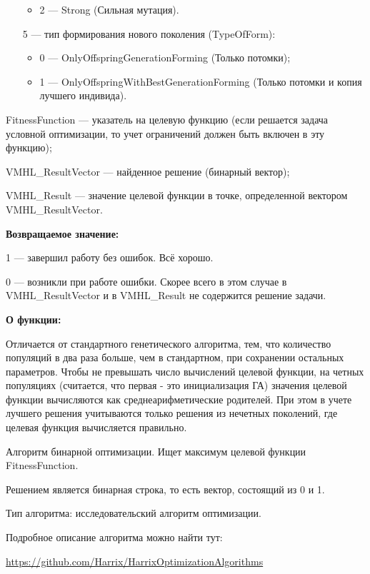 \documentclass[a4paper,12pt]{article}
\begin{document}
\begin{itemize}
\begin{itemize}
       \item 2 --- Strong (Сильная мутация).
	    \end{itemize}
 
 \item [5] --- тип формирования нового поколения (TypeOfForm):
  \begin{itemize}
       \item 0 --- OnlyOffspringGenerationForming (Только потомки);
 
       \item 1 --- OnlyOffspringWithBestGenerationForming (Только потомки и копия лучшего индивида).
	    \end{itemize}
 \end{itemize}
 
FitnessFunction --- указатель на целевую функцию (если решается задача условной оптимизации, то учет ограничений должен быть включен в эту функцию);
 
VMHL\_ResultVector --- найденное решение (бинарный вектор);
 
VMHL\_Result --- значение целевой функции в точке, определенной вектором VMHL\_ResultVector.

\textbf{Возвращаемое значение:} 

 1 --- завершил работу без ошибок. Всё хорошо.
 
 0 --- возникли при работе ошибки. Скорее всего в этом случае в VMHL\_ResultVector и в VMHL\_Result не содержится решение задачи.

\textbf{О функции:}

Отличается от стандартного генетического алгоритма, тем, что количество популяций в два раза больше, чем в стандартном, при сохранении остальных параметров. Чтобы не превышать число вычислений целевой функции, на четных популяциях (считается, что первая - это инициализация ГА) значения целевой функции вычисляются как среднеарифметические родителей. При этом в учете лучшего решения учитываются только решения из нечетных поколений, где целевая функция вычисляется правильно.

Алгоритм бинарной оптимизации. Ищет максимум целевой функции FitnessFunction.

Решением является бинарная строка, то есть вектор, состоящий из 0 и 1.

Тип алгоритма: исследовательский алгоритм оптимизации.

Подробное описание алгоритма можно найти тут:

\href{https://github.com/Harrix/HarrixOptimizationAlgorithms/blob/master/\_HarrixOptimizationAlgorithms.pdf}{https://github.com/Harrix/HarrixOptimizationAlgorithms}
\end{document}
